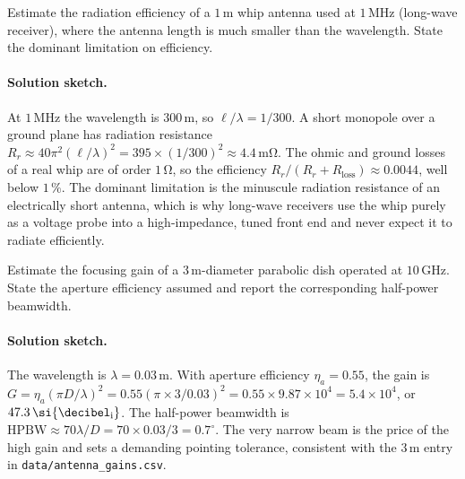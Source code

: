 \begin{exercise}
Estimate the radiation efficiency of a $1\,\si{\meter}$ whip antenna
used at $1\,\si{\mega\hertz}$ (long-wave receiver), where the antenna
length is much smaller than the wavelength. State the dominant
limitation on efficiency.
\paragraph{Solution sketch.} At $1\,\si{\mega\hertz}$ the wavelength is
$300\,\si{\meter}$, so $\ell/\lambda = 1/300$. A short monopole over a
ground plane has radiation resistance $R_{r}\approx 40\pi^{2}(\ell/
\lambda)^{2} = 395\times(1/300)^{2}\approx 4.4\,\si{\milli\ohm}$. The
ohmic and ground losses of a real whip are of order $1\,\si{\ohm}$, so
the efficiency $R_{r}/(R_{r}+R_{\text{loss}})\approx 0.0044$, well below
$1\,\%$. The dominant limitation is the minuscule radiation resistance
of an electrically short antenna, which is why long-wave receivers use
the whip purely as a voltage probe into a high-impedance, tuned front
end and never expect it to radiate efficiently.
\end{exercise}

\begin{exercise}
Estimate the focusing gain of a $3\,\si{\meter}$-diameter parabolic
dish operated at $10\,\si{\giga\hertz}$. State the aperture
efficiency assumed and report the corresponding half-power
beamwidth.
\paragraph{Solution sketch.} The wavelength is $\lambda = 0.03\,\si{
\meter}$. With aperture efficiency $\eta_{a} = 0.55$, the gain is $G =
\eta_{a}(\pi D/\lambda)^{2} = 0.55(\pi\times 3/0.03)^{2} = 0.55\times
9.87\times 10^{4} = 5.4\times 10^{4}$, or
$47.3\,\si{\decibel\textsubscript{i}}$. The half-power beamwidth is
$\text{HPBW}\approx 70\lambda/
D = 70\times 0.03/3 = 0.7^{\circ}$. The very narrow beam is the price of
the high gain and sets a demanding pointing tolerance, consistent with
the $3\,\si{\meter}$ entry in \texttt{data/antenna\_gains.csv}.
\end{exercise}

